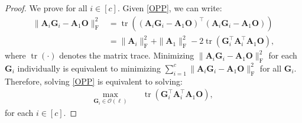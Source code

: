 \documentclass[10pt,a4paper]{amsart}
\newcommand{\matr}[1]{\bm{#1}}        %
\newcommand{\tr}{\operatorname{tr}}
\begin{document}
\begin{proof}
We prove for all \(i \in [c]\). Given \eqref{OPP}, we can write:
\begin{align*}
    \| \matr{A}_i \matr{G}_i - \matr{A}_1 \matr{O} \|_\mathrm{F}^2 
    &= \tr\left((\matr{A}_i \matr{G}_i - \matr{A}_1 \matr{O})^\top (\matr{A}_i \matr{G}_i - \matr{A}_1 \matr{O})\right) \\
    &= \| \matr{A}_i \|_\mathrm{F}^2 + \| \matr{A}_1 \|_\mathrm{F}^2 - 2\tr(\matr{G}_i^\top \matr{A}_i^\top \matr{A}_1 \matr{O}),
\end{align*}
where \(\tr(\cdot)\) denotes the matrix trace. Minimizing \(\| \matr{A}_i \matr{G}_i - \matr{A}_1 \matr{O} \|_\mathrm{F}^2\) for each \(\matr{G}_i\) individually is equivalent to minimizing \(\sum_{i=1}^c \| \matr{A}_i \matr{G}_i - \matr{A}_1 \matr{O} \|_\mathrm{F}^2\) for all \(\matr{G}_i\). Therefore, solving \eqref{OPP} is equivalent to solving:
\begin{equation}
\label{eq: GOPP_trace}
\begin{aligned}
\max_{\matr{G}_i \in \mathcal{O}(\ell)} \quad & \tr(\matr{G}_i^\top \matr{A}_i^\top \matr{A}_1 \matr{O}),
\end{aligned}
\end{equation}
for each \(i \in [c]\). 


\end{proof}
\end{document}
